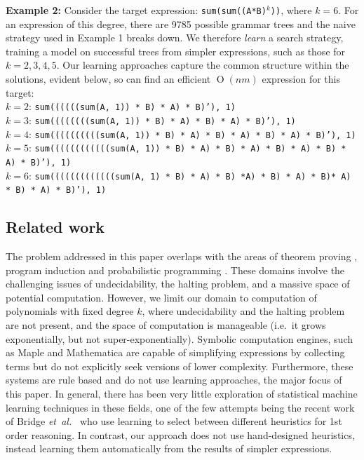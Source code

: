 \documentclass{article} %
\def\etal{{\textit{et~al.~}}}
\newcommand{\BigO}[1]{\ensuremath{\operatorname{O}\left(#1\right)}}
\begin{document}
\begin{minipage}{\linewidth}
\begin{framed}
{\bf Example 2:} Consider the target expression:
\texttt{sum(sum((A*B)$^k$))}, where $k=6$. For an expression of this degree,
there 
are 9785 possible grammar trees and the naive strategy used in Example
1 breaks down. We therefore {\em learn} a search strategy, training a model on successful trees
from simpler expressions, such as those for $k=2,3,4,5$. Our learning approaches
capture the common structure within the solutions, evident below, so can find an efficient $\BigO{nm}$
expression for this target: \\
{\scriptsize
 $k=2$: \texttt{sum((((((sum(A, 1)) * B) * A) * B)'), 1)}\\
$k=3$: \texttt{sum((((((((sum(A, 1)) * B) * A) * B) * A) * B)'), 1)}\\
$k=4$: \texttt{sum((((((((((sum(A, 1)) * B) * A) * B) * A) * B) * A) * B)'), 1)}\\
$k=5$: \texttt{sum((((((((((((sum(A, 1)) * B) * A) * B) * A) * B) * A)  * B) * A) * B)'), 1)}\\
$k=6$: \texttt{sum(((((((((((((sum(A, 1) * B) * A) * B) *A) * B) * A) * B)* A) * B) * A) * B)'), 1)}}
\end{framed}

\end{minipage}

\subsection{Related work}\label{relatedwork}

The problem addressed in this paper overlaps with the areas of theorem
proving \cite{chang1973symbolic,cook1971complexity,fitting1996first},
program induction \cite{nordin1997evolutionary, wong1997evolutionary}
and probabilistic programming
\cite{goodman2012church,pfeffer2011practical}.  These domains involve
the challenging issues of undecidability, the halting problem, and a
massive space of potential computation. However, we limit our domain
to computation of polynomials with fixed degree $k$, where
undecidability and the halting problem are not present, and the space
of computation is manageable (i.e.~it grows exponentially, but not
super-exponentially).  Symbolic computation engines, such as Maple
\cite{char1991maple} and Mathematica \cite{wolfram1996mathematica} are
capable of simplifying expressions by collecting terms but do not
explicitly seek versions of lower complexity. Furthermore, these
systems are rule based and do not use learning approaches, the major
focus of this paper. In general, there has been very little
exploration of statistical machine learning techniques in these
fields, one of the few attempts being the recent work of Bridge \etal \cite{Bridge14} who use learning
to select between different heuristics for 1st order reasoning.
In contrast, our approach does not use hand-designed
heuristics, instead learning them automatically from the results of simpler
expressions. 
\end{document}
